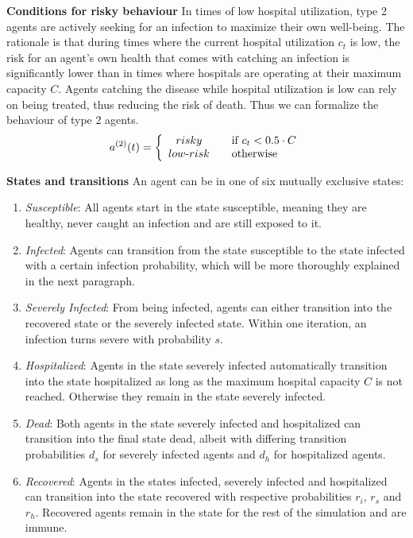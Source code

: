 \documentclass[]{article}
\begin{document}
\textbf{Conditions for risky behaviour} \newline
In times of low hospital utilization, type 2 agents are actively seeking for an infection to maximize their own well-being. The rationale is that during times where the current hospital utilization $c_t$ is low, the risk for an agent's own health that comes with catching an infection is significantly lower than in times where hospitals are operating at their maximum capacity $C$. Agents catching the disease while hospital utilization is low can rely on being treated, thus reducing the risk of death. Thus we can formalize the behaviour of type 2 agents.
$$a^{(2)}(t) = \left\{ 
  \begin{array}{ c l }
    risky & \quad \textrm{if } c_t < 0.5 \cdot C \\
    low\textrm{-}risk                 & \quad \textrm{otherwise}
  \end{array}
\right.$$

\textbf{States and transitions} \newline
An agent can be in one of six mutually exclusive states:
\begin{enumerate}
    \item \textit{Susceptible}: All agents start in the state susceptible, meaning they are healthy, never caught an infection and are still exposed to it.
    \item \textit{Infected}: Agents can transition from the state susceptible to the state infected with a certain infection probability, which will be more thoroughly explained in the next paragraph.
    \item \textit{Severely Infected}: From being infected, agents can either transition into the recovered state or the severely infected state. Within one iteration, an infection turns severe with probability $s$.
    \item \textit{Hospitalized}: Agents in the state severely infected automatically transition into the state hospitalized as long as the maximum hospital capacity $C$ is not reached. Otherwise they remain in the state severely infected.
    \item \textit{Dead}: Both agents in the state severely infected and hospitalized can transition into the final state dead, albeit with differing transition probabilities $d_s$ for severely infected agents and $d_h$ for hospitalized agents.
    \item \textit{Recovered}: Agents in the states infected, severely infected and hospitalized can transition into the state recovered with respective probabilities $r_i$, $r_s$ and $r_h$. Recovered agents remain in the state for the rest of the simulation and are immune.
\end{enumerate}
\end{document}
